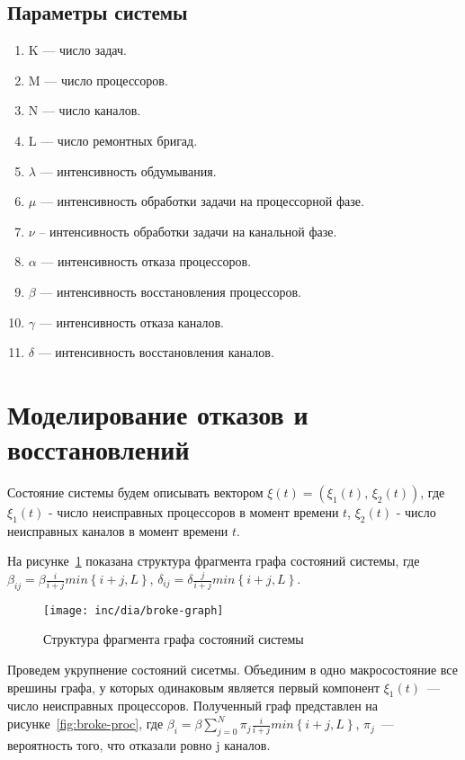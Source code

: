\documentclass[utf8x, 12pt]{G7-32} %
\begin{document}
\newpage
\subsection {Параметры системы}
\begin {enumerate}[]
\item K --- число задач.
\item M --- число процессоров.
\item N --- число каналов.
\item L --- число ремонтных бригад.
\item $\lambda$ --- интенсивность обдумывания.
\item $\mu$ --- интенсивность обработки задачи на процессорной фазе.
\item $\nu$ -- интенсивность обработки задачи на канальной фазе.
\item $\alpha$ --- интенсивность отказа процессоров.
\item $\beta$ --- интенсивность восстановления процессоров.
\item $\gamma$ --- интенсивность отказа каналов.
\item $\delta$ --- интенсивность восстановления каналов.
\end{enumerate}



\section{Моделирование отказов и восстановлений}
Состояние системы будем описывать вектором $ \xi (t) = (\xi_{1}(t),\,\xi_{2}(t))$, где $\xi_{1}(t)$ - число неисправных процессоров в момент времени $t$, $\xi_{2}(t)$ - число неисправных каналов в момент времени $t$.

На рисунке~\ref{fig:broke-graph} показана структура фрагмента графа состояний системы, где $\beta_{ij}=\beta\frac{i}{i+j}min\left\lbrace i+j,L\right\rbrace$, $\delta_{ij}=\delta\frac{j}{i+j}min\left\lbrace i+j,L\right\rbrace$. 
\begin{figure}[ht]
\centering
\texttt{[image: inc/dia/broke-graph]}
\caption{Структура фрагмента графа состояний системы}
\label{fig:broke-graph}
\end{figure}

Проведем укрупнение состояний сисетмы. Объединим в одно макросостояние все врешины графа, у которых одинаковым является первый компонент $\xi_{1}(t)$~--- число неисправных процессоров. Полученный граф представлен на рисунке~\ref{fig:broke-proc}, где $\beta_i=\beta\sum\limits_{j=0}^N\pi_j\frac{i}{i+j}min\left\lbrace i+j,L\right\rbrace$, $\pi_j$~--- вероятность того, что отказали ровно j каналов.
\end{document}
